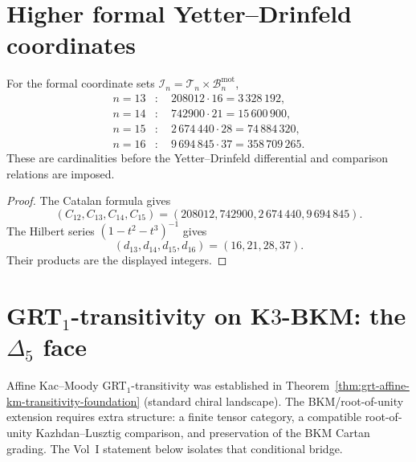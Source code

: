 \section{Higher formal Yetter--Drinfeld coordinates}
\label{sec:YD-delta-n-13-16}

\begin{theorem}
\label{thm:YD-delta-13-16}
%
For the formal coordinate sets
\(\mathcal I_n=\mathcal T_n\times\mathcal B_n^{\mathrm{mot}}\),
\begin{equation}
\begin{aligned}
 n=13&:\quad 208012\cdot16=3\,328\,192,\\
 n=14&:\quad 742900\cdot21=15\,600\,900,\\
 n=15&:\quad 2\,674\,440\cdot28=74\,884\,320,\\
 n=16&:\quad 9\,694\,845\cdot37=358\,709\,265.
\end{aligned}
\label{eq:YD-delta-13-16-dim}
\end{equation}
These are cardinalities before the Yetter--Drinfeld differential and
comparison relations are imposed.
\end{theorem}

\begin{proof}
The Catalan formula gives
\[
 (C_{12},C_{13},C_{14},C_{15})
 =(208012,742900,2\,674\,440,9\,694\,845).
\]
The Hilbert series \((1-t^2-t^3)^{-1}\) gives
\[
 (d_{13},d_{14},d_{15},d_{16})=(16,21,28,37).
\]
Their products are the displayed integers.
\end{proof}

\section{GRT$_1$-transitivity on K$3$-BKM: the $\Delta_5$ face}
\label{sec:grt-1-transitivity-bkm-delta5}

Affine Kac--Moody GRT$_1$-transitivity was established in
Theorem~\ref{thm:grt-affine-km-transitivity-foundation} (standard
chiral landscape). The BKM/root-of-unity extension requires extra
structure: a finite tensor category, a compatible root-of-unity
Kazhdan--Lusztig comparison, and preservation of the BKM Cartan
grading. The Vol~I statement below isolates that conditional bridge.

